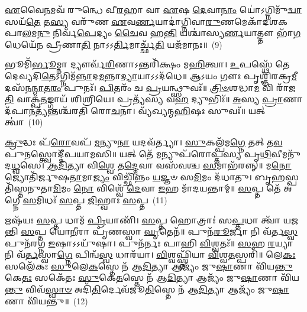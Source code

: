 \-\ul{𑌏}\-𑌵𑍈\-\ul{𑌨}\-𑌮𑌵᳴ 𑌰𑍁𑌨𑍍𑌧𑍇 𑌵𑍀\-\ul{𑌰}\-𑌹𑌾 𑌵𑌾 \ul{𑌏}\-𑌷 \ul{𑌦𑍇}\-𑌵𑌾\-\ul{𑌨𑌾𑌂} 𑌯𑍋॑\-𑌽𑌗𑍍𑌨𑌿𑌮𑍁᳴\-\ul{𑌦𑍍𑌵𑌾}\-𑌸𑌯᳴\-\ul{𑌤𑍇} 𑌤\-\ul{𑌸𑍍𑌯} 𑌵𑌰𑍁᳴𑌣 \ul{𑌏}\-𑌵\-\ul{𑌰𑍍𑌣}\-𑌯𑌾𑌦𑌾॑𑌗𑍍𑌨𑌿𑌵𑌾\-\ul{𑌰𑍁}\-𑌣𑌮𑍇𑌕𑌾᳴\-𑌦𑌶\-𑌕𑌪𑌾\-\ul{𑌲}\-𑌮\-\ul{𑌨𑍁} 𑌨𑌿𑌰𑍍𑌵᳴\-\ul{𑌪𑍇}\-𑌦𑍍𑌯𑌂 \ul{𑌚𑍈}\-𑌵 𑌹\-\ul{𑌨𑍍𑌤𑌿} 𑌯𑌶𑍍𑌚𑌾॑𑌸𑍍𑌯\-\ul{𑌰𑍍𑌣}\-𑌯𑌾𑌤𑍍𑌤𑍗 𑌭𑌾᳴\-\ul{𑌗}\-𑌧𑍇𑌯𑍇᳴𑌨 𑌪𑍍𑌰𑍀𑌣𑌾\-\ul{𑌤𑌿} 𑌨𑌾\-𑌽\-𑌽\-\ul{𑌰𑍍𑌤𑌿}\-𑌮𑌾𑌰𑍍𑌚𑍍𑌛᳴\-\ul{𑌤𑌿} 𑌯𑌜᳴𑌮𑌾𑌨𑌃॥~(9)

{\anuvakamend[{𑌆\-𑌽𑌪᳴𑌰𑌾𑌭𑌾𑌵𑌾𑌯 𑌪𑍁\-\ul{𑌰𑍋}\-𑌡𑌾𑌶᳴\-\ul{𑌮𑍇}\-𑌤𑍇 𑌆𑌹𑍁᳴\-\ul{𑌤𑍀} 𑌤\-\ul{𑌤𑌃} 𑌷𑌟𑍍𑌤𑍍𑌰𑌿𑍞᳴𑌶𑌚𑍍𑌚}]}%

𑌭𑍂𑌮𑌿᳴\-\ul{𑌰𑍍𑌭𑍂}\-𑌮𑍍𑌨𑌾 𑌦𑍍𑌯𑍗𑌰𑍍𑌵᳴\-\ul{𑌰𑌿}\-𑌣𑌾\-𑌽𑌨𑍍𑌤𑌰𑌿᳴𑌕𑍍𑌷𑌂 𑌮\-\ul{𑌹𑌿}\-𑌤𑍍𑌵𑌾। \ul{𑌉}\-𑌪𑌸𑍍𑌥𑍇᳴ 𑌤𑍇 𑌦𑍇𑌵𑍍𑌯𑌦𑌿\-\ul{𑌤𑍇}\-\-𑌽𑌗𑍍𑌨𑌿𑌮᳴\-\ul{𑌨𑍍𑌨𑌾}\-𑌦\-\ul{𑌮}\-𑌨𑍍𑌨𑌾\-\ul{𑌦𑍍𑌯𑌾}\-𑌯𑌾\-𑌽\-𑌽𑌦᳴𑌧𑍇॥ 𑌆\-𑌽𑌯𑌂 𑌗𑍗𑌃 𑌪𑍃𑌶𑍍𑌞𑌿᳴𑌰𑌕𑍍𑌰\-\ul{𑌮𑍀}\-𑌦𑌸᳴𑌨\-\ul{𑌨𑍍𑌮𑌾}\-𑌤\-\ul{𑌰𑌂} 𑌪𑍁𑌨𑌃᳴। \ul{𑌪𑌿}\-𑌤𑌰𑌂᳴ 𑌚 \ul{𑌪𑍍𑌰}\-𑌯𑌨𑍍𑌥𑍍𑌸𑍁𑌵𑌃᳴॥ \ul{𑌤𑍍𑌰𑌿}\-\-\ul{𑍞}\-𑌶𑌦𑍍𑌧𑌾\-\ul{𑌮} 𑌵𑌿 𑌰𑌾᳴𑌜\-\ul{𑌤𑌿} 𑌵𑌾𑌕𑍍𑌪᳴\-\ul{𑌤}\-𑌙𑍍𑌗𑌾𑌯᳴ 𑌶𑌿𑌶𑍍𑌰𑌿𑌯𑍇। 𑌪𑍍𑌰𑌤𑍍𑌯᳴𑌸𑍍𑌯 𑌵\-\ul{𑌹} 𑌦𑍍𑌯𑍁𑌭𑌿𑌃᳴॥ \ul{𑌅}\-𑌸𑍍𑌯 \ul{𑌪𑍍𑌰𑌾}\-𑌣𑌾𑌦᳴𑌪𑌾\-\ul{𑌨}\-𑌤𑍍𑌯᳴𑌨𑍍𑌤𑌶𑍍𑌚᳴𑌰𑌤𑌿 𑌰𑍋\-\ul{𑌚}\-𑌨𑌾। 𑌵𑍍𑌯᳴𑌖𑍍𑌯𑌨𑍍𑌮\-\ul{𑌹𑌿}\-𑌷𑌃 𑌸𑍁𑌵𑌃᳴॥ 𑌯𑌤𑍍 𑌤𑍍𑌵𑌾॑~(10)

\-\ul{𑌕𑍍𑌰𑍁}\-𑌦𑍍𑌧𑌃 𑌪᳴\-\ul{𑌰𑍋}\-𑌵𑌪᳴ \ul{𑌮}\-𑌨𑍍𑌯𑍁\-\ul{𑌨𑌾} 𑌯𑌦𑌵᳴𑌰𑍍𑌤𑍍𑌯𑌾। \ul{𑌸𑍁}\-𑌕𑌲𑍍𑌪᳴𑌮\-\ul{𑌗𑍍𑌨𑍇} 𑌤𑌤𑍍 𑌤\-\ul{𑌵} 𑌪𑍁\-\ul{𑌨}\-𑌸𑍍𑌤𑍍𑌵𑍋𑌦𑍍𑌦𑍀᳴𑌪𑌯𑌾𑌮𑌸𑌿॥ 𑌯𑌤𑍍 𑌤𑍇᳴ \ul{𑌮}\-𑌨𑍍𑌯𑍁𑌪᳴𑌰𑍋𑌪𑍍𑌤𑌸𑍍𑌯 𑌪𑍃\-\ul{𑌥𑌿}\-𑌵𑍀𑌮𑌨𑍁᳴ 𑌦\-\ul{𑌧𑍍𑌵}\-𑌸𑍇। \ul{𑌆}\-\-\ul{𑌦𑌿}\-𑌤𑍍𑌯𑌾 𑌵𑌿\-\ul{𑌶𑍍𑌵𑍇} 𑌤\-\ul{𑌦𑍍𑌦𑍇}\-𑌵𑌾 𑌵𑌸᳴𑌵𑌶𑍍𑌚 \ul{𑌸}\-𑌮𑌾𑌭᳴𑌰𑌨𑍍𑌨𑍍॥ 𑌮\-\ul{𑌨𑍋} 𑌜𑍍𑌯𑍋𑌤𑌿᳴𑌰𑍍𑌜𑍁𑌷\-\ul{𑌤𑌾}\-𑌮𑌾\-\ul{𑌜𑍍𑌯𑌂} 𑌵𑌿𑌚𑍍𑌛𑌿᳴𑌨𑍍𑌨𑌂 \ul{𑌯}\-𑌜𑍍𑌞𑍞 𑌸\-\ul{𑌮𑌿}\-𑌮𑌂 𑌦᳴𑌧𑌾𑌤𑍁। 𑌬𑍃\-\ul{𑌹}\-𑌸𑍍𑌪𑌤𑌿᳴𑌸𑍍𑌤𑌨𑍁𑌤𑌾\-\ul{𑌮𑌿}\-𑌮𑌂 \ul{𑌨𑍋} 𑌵𑌿𑌶𑍍𑌵𑍇᳴ \ul{𑌦𑍇}\-𑌵𑌾 \ul{𑌇}\-𑌹 𑌮𑌾᳴𑌦𑌯𑌨𑍍𑌤𑌾𑌮𑍍॥ \ul{𑌸}\-𑌪𑍍𑌤 𑌤𑍇᳴ 𑌅𑌗𑍍𑌨𑍇 \ul{𑌸}\-𑌮𑌿𑌧𑌃᳴ \ul{𑌸}\-𑌪𑍍𑌤 \ul{𑌜𑌿}\-𑌹𑍍𑌵𑌾𑌃 \ul{𑌸}\-𑌪𑍍𑌤~(11)

𑌋𑌷᳴𑌯𑌃 \ul{𑌸}\-𑌪𑍍𑌤 𑌧𑌾𑌮᳴ \ul{𑌪𑍍𑌰𑌿}\-𑌯𑌾𑌣𑌿᳴। \ul{𑌸}\-𑌪𑍍𑌤 𑌹𑍋𑌤𑍍𑌰𑌾𑌃॑ 𑌸\-\ul{𑌪𑍍𑌤}\-𑌧𑌾 𑌤𑍍𑌵𑌾᳴ 𑌯𑌜𑌨𑍍𑌤𑌿 \ul{𑌸}\-𑌪𑍍𑌤 𑌯𑍋\-\ul{𑌨𑍀}\-𑌰𑌾 𑌪𑍃᳴𑌣𑌸𑍍𑌵𑌾 \ul{𑌘𑍃}\-𑌤𑍇𑌨᳴॥ 𑌪𑍁𑌨᳴\-\ul{𑌰𑍂}\-𑌰𑍍𑌜𑌾 𑌨𑌿 𑌵᳴𑌰𑍍𑌤\-\ul{𑌸𑍍𑌵} 𑌪𑍁𑌨᳴𑌰𑌗𑍍𑌨 \ul{𑌇}\-𑌷𑌾\-𑌽\-𑌽𑌯𑍁᳴𑌷𑌾। 𑌪𑍁𑌨᳴𑌰𑍍𑌨𑌃 𑌪𑌾𑌹𑌿 \ul{𑌵𑌿}\-𑌶𑍍𑌵𑌤𑌃᳴॥ \ul{𑌸}\-𑌹 \ul{𑌰}\-𑌯𑍍𑌯𑌾 𑌨𑌿 𑌵᳴\-\ul{𑌰𑍍𑌤}\-𑌸𑍍𑌵𑌾\-\ul{𑌗𑍍𑌨𑍇} 𑌪𑌿𑌨𑍍𑌵᳴\-\ul{𑌸𑍍𑌵} 𑌧𑌾𑌰᳴𑌯𑌾। \ul{𑌵𑌿}\-𑌶𑍍𑌵𑌫𑍍𑌸𑍍𑌨𑌿᳴𑌯𑌾 \ul{𑌵𑌿}\-𑌶𑍍𑌵\-\ul{𑌤}\-𑌸𑍍𑌪𑌰𑌿᳴॥ 𑌲𑍇\-\ul{𑌕𑌃} 𑌸𑌲𑍇᳴𑌕𑌃 \ul{𑌸𑍁}\-𑌲𑍇\-\ul{𑌕}\-𑌸𑍍𑌤𑍇 𑌨᳴ 𑌆\-\ul{𑌦𑌿}\-𑌤𑍍𑌯𑌾 𑌆𑌜𑍍𑌯𑌂᳴ 𑌜𑍁\-\ul{𑌷𑌾}\-𑌣𑌾 𑌵𑌿᳴𑌯\-\ul{𑌨𑍍𑌤𑍁} 𑌕𑍇\-\ul{𑌤𑌃} 𑌸𑌕𑍇᳴𑌤𑌃 \ul{𑌸𑍁}\-𑌕𑍇\-\ul{𑌤}\-𑌸𑍍𑌤𑍇 𑌨᳴ 𑌆\-\ul{𑌦𑌿}\-𑌤𑍍𑌯𑌾 𑌆𑌜𑍍𑌯𑌂᳴ 𑌜𑍁\-\ul{𑌷𑌾}\-𑌣𑌾 𑌵𑌿᳴𑌯\-\ul{𑌨𑍍𑌤𑍁} 𑌵𑌿𑌵᳴\-\ul{𑌸𑍍𑌵𑌾}\-\-\ul{𑍞} 𑌅𑌦𑌿᳴\-\ul{𑌤𑌿}\-𑌰𑍍𑌦𑍇𑌵᳴𑌜𑍂\-\ul{𑌤𑌿}\-𑌸𑍍𑌤𑍇 𑌨᳴ 𑌆\-\ul{𑌦𑌿}\-𑌤𑍍𑌯𑌾 𑌆𑌜𑍍𑌯𑌂᳴ 𑌜𑍁\-\ul{𑌷𑌾}\-𑌣𑌾 𑌵𑌿᳴𑌯𑌨𑍍𑌤𑍁॥~(12)

{\anuvakamend[{\-\ul{𑌤𑍍𑌵𑌾} \ul{𑌜𑌿}\-𑌹𑍍𑌵𑌾𑌃 \ul{𑌸}\-𑌪𑍍𑌤 \ul{𑌸𑍁}\-𑌕𑍇\-\ul{𑌤}\-𑌸𑍍𑌤𑍇 \ul{𑌨}\-𑌸𑍍𑌤𑍍𑌰𑌯𑍋᳴𑌦𑌶 𑌚}]}%

